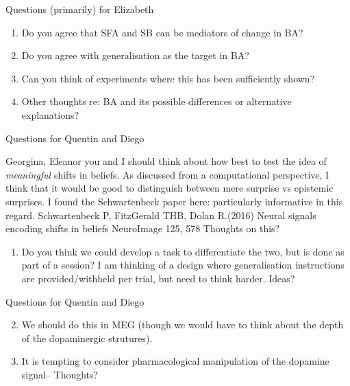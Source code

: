 \documentclass[
  ignorenonframetext,
]{beamer}
\providecommand{\tightlist}{%
  \setlength{\itemsep}{0pt}\setlength{\parskip}{0pt}}
\begin{document}
\begin{frame}{Questions (primarily) for Elizabeth}
\protect\hypertarget{questions-primarily-for-elizabeth}{}

\begin{enumerate}
\tightlist
\item
  Do you agree that SFA and SB can be mediators of change in BA?
\item
  Do you agree with generalisation as the target in BA?
\item
  Can you think of experiments where this has been sufficiently shown?
\item
  Other thoughts re: BA and its possible differences or alternative
  explanations?
\end{enumerate}

\end{frame}

\begin{frame}{Questions for Quentin and Diego}
\protect\hypertarget{questions-for-quentin-and-diego}{}

Georgina, Eleanor you and I should think about how best to test the idea
of \emph{meaningful} shifts in beliefs. As discussed from a
computational perspective, I think that it would be good to distinguish
between mere surprise vs epistemic surprises. I found the Schwartenbeck
paper here: particularly informative in this regard. Schwartenbeck P,
FitzGerald THB, Dolan R.(2016) Neural signals encoding shifts in beliefs
NeuroImage 125, 578 Thoughts on this?

\begin{enumerate}
\tightlist
\item
  Do you think we could develop a task to differentiate the two, but is
  done as part of a session? I am thinking of a design where
  generalisation instructions are provided/withheld per trial, but need
  to think harder. Ideas?
\end{enumerate}

\end{frame}

\begin{frame}{Questions for Quentin and Diego}
\protect\hypertarget{questions-for-quentin-and-diego-1}{}

\begin{enumerate}
\setcounter{enumi}{1}
\item
  We should do this in MEG (though we would have to think about the
  depth of the dopaminergic strutures).
\item
  It is tempting to consider pharmacological manipulation of the
  dopamine signal-- Thoughts?
\end{enumerate}

\end{frame}
\end{document}
